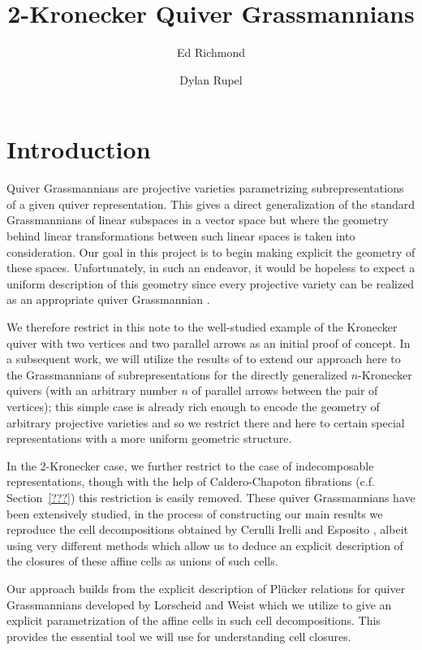 \documentclass{amsart}
\title{2-Kronecker Quiver Grassmannians}
\author{Ed Richmond}
\author{Dylan Rupel}
\numberwithin{equation}{section}
\begin{document}
  \maketitle

  \section{Introduction}
  Quiver Grassmannians are projective varieties parametrizing subrepresentations of a given quiver representation.
  This gives a direct generalization of the standard Grassmannians of linear subspaces in a vector space but where the geometry behind linear transformations between such linear spaces is taken into consideration.
  Our goal in this project is to begin making explicit the geometry of these spaces.
  Unfortunately, in such an endeavor, it would be hopeless to expect a uniform description of this geometry since every projective variety can be realized as an appropriate quiver Grassmannian \cite{reineke}.
  
  We therefore restrict in this note to the well-studied example of the Kronecker quiver with two vertices and two parallel arrows as an initial proof of concept.
  In a subsequent work, we will utilize the results of \cite{rupel-weist} to extend our approach here to the Grassmannians of subrepresentations for the directly generalized $n$-Kronecker quivers (with an arbitrary number $n$ of parallel arrows between the pair of vertices); this simple case is already rich enough to encode the geometry of arbitrary projective varieties and so we restrict there and here to certain special representations with a more uniform geometric structure.

  In the 2-Kronecker case, we further restrict to the case of indecomposable representations, though with the help of Caldero-Chapoton fibrations (c.f. Section~\ref{???}) this restriction is easily removed.
  These quiver Grassmannians have been extensively studied, in the process of constructing our main results we reproduce the cell decompositions obtained by Cerulli Irelli and Esposito \cite{cerulli irelli-esposito}, albeit using very different methods which allow us to deduce an explicit description of the closures of these affine cells as unions of such cells.

  Our approach builds from the explicit description of Pl\"ucker relations for quiver Grassmannians developed by Lorscheid and Weist \cite{lorscheid-weist} which we utilize to give an explicit parametrization of the affine cells in such cell decompositions.
  This provides the essential tool we will use for understanding cell closures.
\end{document}
